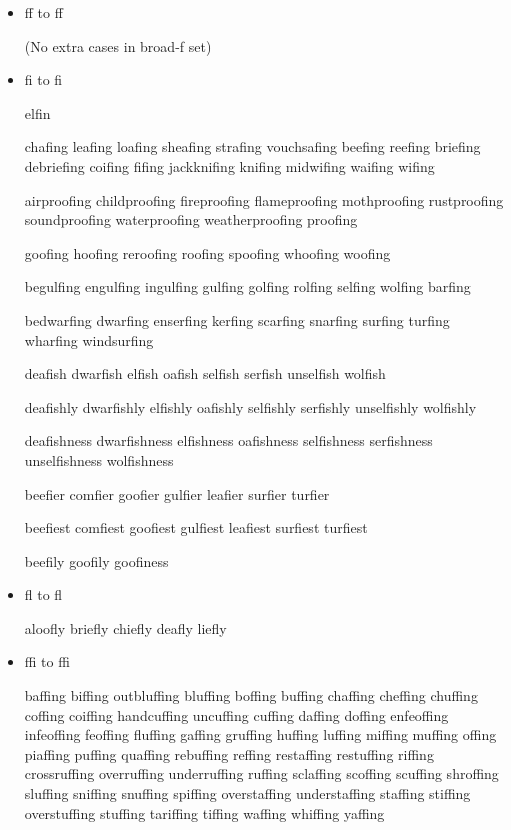 \begin{itemize}

\item ff to f\hspace{0pt}f

(No extra cases in broad-f set)


\item fi to f\hspace{0pt}i

elfin

chafing leafing loafing sheafing strafing vouchsafing
beefing reefing briefing debriefing
coifing fifing jackknifing knifing midwifing waifing wifing

airproofing childproofing fireproofing flameproofing mothproofing rustproofing soundproofing waterproofing weatherproofing proofing

goofing hoofing reroofing roofing spoofing whoofing woofing

begulfing engulfing ingulfing gulfing golfing rolfing selfing wolfing
barfing

bedwarfing dwarfing enserfing kerfing scarfing snarfing
surfing turfing wharfing windsurfing

deafish dwarfish elfish oafish selfish serfish unselfish wolfish

deafishly dwarfishly elfishly oafishly selfishly serfishly unselfishly wolfishly

deafishness dwarfishness elfishness oafishness selfishness serfishness unselfishness wolfishness

beefier comfier goofier gulfier leafier surfier turfier

beefiest comfiest goofiest gulfiest leafiest surfiest turfiest

beefily goofily goofiness


\item fl to f\hspace{0pt}l

aloofly briefly chiefly deafly liefly


\item ffi to ff\hspace{0pt}i

baffing biffing outbluffing bluffing boffing buffing chaffing cheffing chuffing coffing coiffing handcuffing uncuffing cuffing daffing doffing enfeoffing infeoffing feoffing fluffing gaffing gruffing huffing luffing miffing muffing offing piaffing puffing quaffing rebuffing reffing restaffing restuffing riffing crossruffing overruffing underruffing ruffing sclaffing scoffing scuffing shroffing sluffing sniffing snuffing spiffing overstaffing understaffing staffing stiffing overstuffing stuffing tariffing tiffing waffing whiffing yaffing


\end{itemize}
